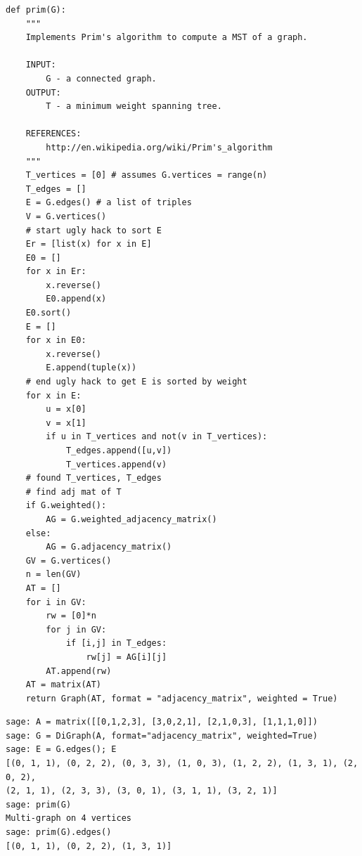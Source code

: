\begin{lstlisting}
def prim(G):
    """
    Implements Prim's algorithm to compute a MST of a graph.

    INPUT:
        G - a connected graph.
    OUTPUT:
        T - a minimum weight spanning tree.

    REFERENCES:
        http://en.wikipedia.org/wiki/Prim's_algorithm
    """
    T_vertices = [0] # assumes G.vertices = range(n)
    T_edges = []
    E = G.edges() # a list of triples
    V = G.vertices()
    # start ugly hack to sort E
    Er = [list(x) for x in E]
    E0 = []
    for x in Er:
        x.reverse()
        E0.append(x)
    E0.sort()
    E = []
    for x in E0:
        x.reverse()
        E.append(tuple(x))
    # end ugly hack to get E is sorted by weight
    for x in E:
        u = x[0]
        v = x[1]
        if u in T_vertices and not(v in T_vertices):
            T_edges.append([u,v])
            T_vertices.append(v)
    # found T_vertices, T_edges
    # find adj mat of T
    if G.weighted():
        AG = G.weighted_adjacency_matrix()
    else:
        AG = G.adjacency_matrix()
    GV = G.vertices()
    n = len(GV)
    AT = []
    for i in GV:
        rw = [0]*n
        for j in GV:
            if [i,j] in T_edges:
                rw[j] = AG[i][j]
        AT.append(rw)
    AT = matrix(AT)
    return Graph(AT, format = "adjacency_matrix", weighted = True)
\end{lstlisting}

\begin{lstlisting}
sage: A = matrix([[0,1,2,3], [3,0,2,1], [2,1,0,3], [1,1,1,0]])
sage: G = DiGraph(A, format="adjacency_matrix", weighted=True)
sage: E = G.edges(); E
[(0, 1, 1), (0, 2, 2), (0, 3, 3), (1, 0, 3), (1, 2, 2), (1, 3, 1), (2, 0, 2),
(2, 1, 1), (2, 3, 3), (3, 0, 1), (3, 1, 1), (3, 2, 1)]
sage: prim(G)
Multi-graph on 4 vertices
sage: prim(G).edges()
[(0, 1, 1), (0, 2, 2), (1, 3, 1)]
\end{lstlisting}

